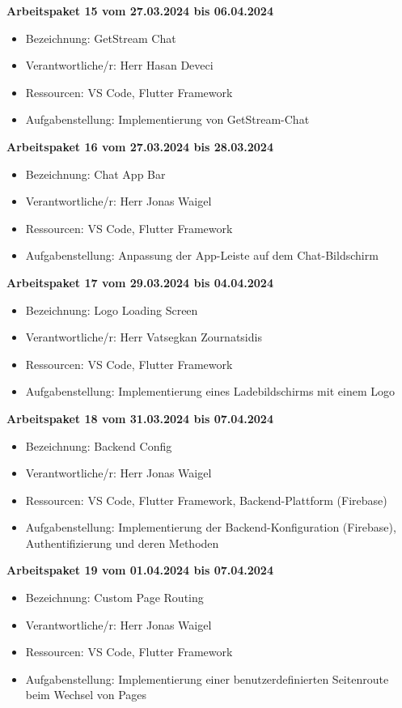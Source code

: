 \textbf{Arbeitspaket 15 vom 27.03.2024 bis 06.04.2024}
\begin{itemize}[itemsep=0pt]
    \item{Bezeichnung: GetStream Chat} 
	\item{Verantwortliche/r: Herr Hasan Deveci} 
	\item{Ressourcen: VS Code, Flutter Framework} 
    \item{Aufgabenstellung: Implementierung von GetStream-Chat}
\end{itemize}

\textbf{Arbeitspaket 16 vom 27.03.2024 bis 28.03.2024}
\begin{itemize}[itemsep=0pt]
    \item{Bezeichnung: Chat App Bar}
	\item{Verantwortliche/r: Herr Jonas Waigel} 
	\item{Ressourcen: VS Code, Flutter Framework} 
    \item{Aufgabenstellung: Anpassung der App-Leiste auf dem Chat-Bildschirm}
\end{itemize} 

\newpage
\textbf{Arbeitspaket 17 vom 29.03.2024 bis 04.04.2024}
\begin{itemize}[itemsep=0pt]
    \item{Bezeichnung: Logo Loading Screen} 
	\item{Verantwortliche/r: Herr Vatsegkan Zournatsidis} 
	\item{Ressourcen: VS Code, Flutter Framework} 
    \item{Aufgabenstellung: Implementierung eines Ladebildschirms mit einem Logo}
\end{itemize}

\textbf{Arbeitspaket 18 vom 31.03.2024 bis 07.04.2024}
\begin{itemize}[itemsep=0pt]
    \item{Bezeichnung: Backend Config} 
	\item{Verantwortliche/r: Herr Jonas Waigel} 
	\item{Ressourcen: VS Code, Flutter Framework, Backend-Plattform (Firebase)}
    \item{Aufgabenstellung: Implementierung der Backend-Konfiguration (Firebase), Authentifizierung und deren Methoden} 
\end{itemize}

\textbf{Arbeitspaket 19 vom 01.04.2024 bis 07.04.2024}
\begin{itemize}[itemsep=0pt]
    \item{Bezeichnung: Custom Page Routing} 
	\item{Verantwortliche/r: Herr Jonas Waigel} 
	\item{Ressourcen: VS Code, Flutter Framework} 
    \item{Aufgabenstellung: Implementierung einer benutzerdefinierten Seitenroute beim Wechsel von Pages}
\end{itemize} 

